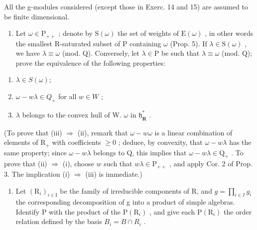 
All the g-modules considered (except those in Exerc. 14 and 15) are assumed to be finite dimensional.

\begin{enumerate}
\def\labelenumi{\arabic{enumi})}
\tightlist
\item
  Let \(\omega \in \mathrm{P}_{++}\) ; denote by \(\mathrm{S}(\omega)\) the set of weights of \(\mathrm{E}(\omega)\) , in other words the smallest R-saturated subset of P containing \(\omega\) (Prop. 5). If \(\lambda \in \mathrm{S}(\omega)\) , we have \(\lambda \equiv \omega\) (mod. Q). Conversely, let \(\lambda \in \mathrm{P}\) be such that \(\lambda \equiv \omega\) (mod. Q); prove the equivalence of the following properties:
\end{enumerate}

\begin{enumerate}
\def\labelenumi{(\roman{enumi})}
\item
  \(\lambda \in S(\omega);\)
\item
  \(\omega - w\lambda \in Q_{+}\) for all \(w \in W\) ;
\item
  \(\lambda\) belongs to the convex hull of W. \(\omega\) in \(\mathfrak{h}_{\mathbf{R}}^{*}\) .
\end{enumerate}

(To prove that (iii) \(\Longrightarrow\) (ii), remark that \(\omega - w\omega\) is a linear combination of elements of \(\mathrm{R}_{+}\) with coefficients \(\geq 0\) ; deduce, by convexity, that \(\omega - w\lambda\) has the same property; since \(\omega - w\lambda\) belongs to Q, this implies that \(\omega - w\lambda \in \mathrm{Q}_{+}\) . To prove that (ii) \(\Longrightarrow\) (i), choose \(w\) such that \(w\lambda \in \mathrm{P}_{++}\) , and apply Cor. 2 of Prop. 3. The implication (i) \(\Longrightarrow\) (iii) is immediate.)

\begin{enumerate}
\def\labelenumi{\arabic{enumi})}
\setcounter{enumi}{1}
\tightlist
\item
  Let \((\mathrm{R}_{i})_{i\in\mathrm{I}}\) be the family of irreducible components of R, and \(g=\prod_{i\in I}g_{i}\) the corresponding decomposition of g into a product of simple algebras. Identify P with the product of the \(\mathrm{P}(\mathrm{R}_{i})\) , and give each \(\mathrm{P}(\mathrm{R}_{i})\) the order relation defined by the basis \(B_{i}=B\cap R_{i}\) .
\end{enumerate}

